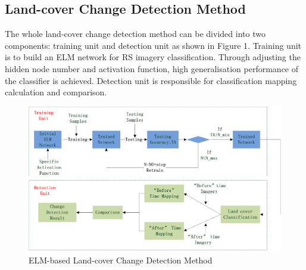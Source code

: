 \documentclass{elsart}
\begin{document}
\subsection{Land-cover Change Detection Method}
The whole land-cover change detection method can be divided into two components: training unit and detection unit as shown in Figure 1.
Training unit is to build an ELM network for RS imagery classification.
Through adjusting the hidden node number and activation function, high generalisation performance of the classifier is achieved.
Detection unit is responsible for classification mapping calculation and comparison.
\begin{figure}[H]
\begin{center}
\includegraphics[width=15cm]{method.eps}
\caption{ELM-based Land-cover Change Detection Method}
\label{method}
\end{center}
\end{figure}
\par
\end{document}
